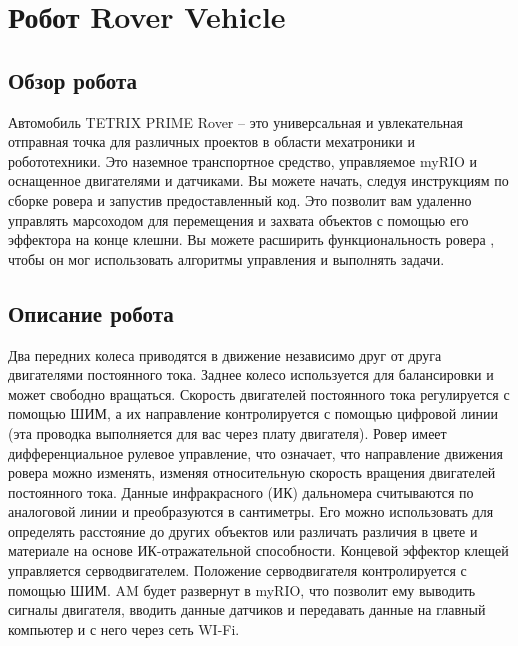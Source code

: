 \section{Робот Rover Vehicle}
\subsection{Обзор робота}
Автомобиль TETRIX PRIME Rover -- это универсальная и увлекательная отправная
точка для различных проектов в области мехатроники и робототехники.
Это наземное транспортное средство, управляемое myRIO и оснащенное
двигателями и датчиками. Вы можете начать, следуя инструкциям по
сборке ровера и запустив предоставленный код. Это позволит вам
удаленно управлять марсоходом для перемещения и захвата объектов с помощью его
эффектора на конце клешни. Вы можете расширить функциональность ровера
, чтобы он мог использовать алгоритмы управления и выполнять задачи.

\subsection{Описание робота}
Два передних колеса приводятся в движение независимо друг от друга двигателями постоянного тока. Заднее колесо используется для балансировки и может свободно вращаться.
Скорость двигателей постоянного тока регулируется с помощью ШИМ, а их направление контролируется с помощью цифровой линии (эта проводка выполняется для вас через плату двигателя).
Ровер имеет дифференциальное рулевое управление, что означает, что направление движения ровера можно изменять, изменяя относительную скорость вращения двигателей постоянного тока.
Данные инфракрасного (ИК) дальномера считываются по аналоговой линии и преобразуются в сантиметры. Его можно использовать для определять расстояние до других объектов или различать различия в цвете и материале на основе ИК-отражательной способности.
Концевой эффектор клещей управляется серводвигателем. Положение серводвигателя контролируется с помощью ШИМ.
AM будет развернут в myRIO, что позволит ему выводить сигналы двигателя, вводить данные датчиков и передавать данные на главный компьютер и с него через сеть WI-Fi.

\newpage
